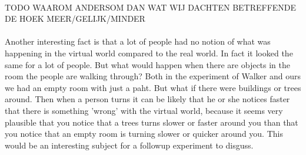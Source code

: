 \\
TODO WAAROM ANDERSOM DAN WAT WIJ DACHTEN BETREFFENDE DE HOEK MEER/GELIJK/MINDER\\
\\
Another interesting fact is that a lot of people had no notion of what was happening in the virtual world compared to the real world. In fact it looked the same for a lot of people. But what would happen when there are objects in the room the people are walking through? Both in the experiment of Walker \cite{jwalker} and ours we had an empty room with just a paht. But what if there were buildings or trees around. Then when a person turns it can be likely that he or she notices faster that there is something 'wrong'  with the virtual world, because it seems very plausible that you notice that a trees turns slower or faster around you than that you notice that an empty room is turning slower or quicker around you. This would be an interesting subject for a followup experiment to disguss.